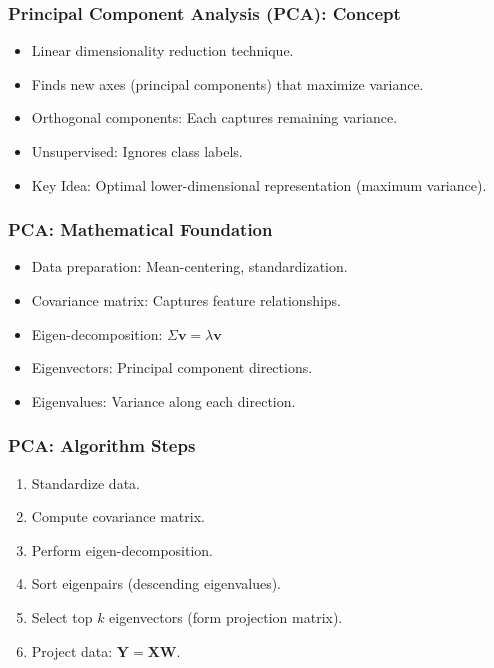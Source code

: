 \documentclass[aspectratio=169]{beamer}
\begin{document}
\begin{frame}
\frametitle{Principal Component Analysis (PCA): Concept}
\begin{itemize}
    \item Linear dimensionality reduction technique.
    \item Finds new axes (principal components) that maximize variance.
    \item Orthogonal components: Each captures remaining variance.
    \item Unsupervised: Ignores class labels.
    \item Key Idea:  Optimal lower-dimensional representation (maximum variance).
\end{itemize}
\end{frame}

\begin{frame}
\frametitle{PCA: Mathematical Foundation}
\begin{itemize}
    \item Data preparation: Mean-centering, standardization.
    \item Covariance matrix:  Captures feature relationships.
    \item Eigen-decomposition:  $\Sigma \mathbf{v} = \lambda \mathbf{v}$
    \item Eigenvectors: Principal component directions.
    \item Eigenvalues: Variance along each direction.
\end{itemize}
\end{frame}

\begin{frame}
\frametitle{PCA: Algorithm Steps}
\begin{enumerate}
    \item Standardize data.
    \item Compute covariance matrix.
    \item Perform eigen-decomposition.
    \item Sort eigenpairs (descending eigenvalues).
    \item Select top $k$ eigenvectors (form projection matrix).
    \item Project data: $\mathbf{Y} = \mathbf{XW}$.
\end{enumerate}
\end{frame}
\end{document}
